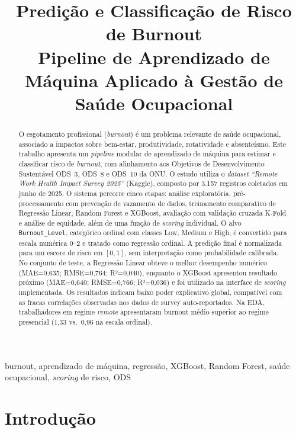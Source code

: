 \documentclass[conference]{IEEEtran}
\title{Predição e Classificação de Risco de Burnout\\{\large Pipeline de Aprendizado de Máquina Aplicado à Gestão de Saúde Ocupacional}}
\author{%
\IEEEauthorblockN{Breno Porto Pinheiro do Prado, RA 185196\\
Guilherme Bento Ramos, RA 185226}
\IEEEauthorblockA{\instituicao\\
\cidade\\
2026}
}
\begin{document}

\maketitle

\begin{abstract}
O esgotamento profissional (\textit{burnout}) é um problema relevante de
saúde ocupacional, associado a impactos sobre bem-estar, produtividade,
rotatividade e absenteísmo. Este trabalho apresenta um \textit{pipeline}
modular de aprendizado de máquina para estimar e classificar risco de
\textit{burnout}, com alinhamento aos Objetivos de Desenvolvimento
Sustentável ODS~3, ODS~8 e ODS~10 da ONU. O estudo utiliza o
\textit{dataset} \textit{``Remote Work Health Impact Survey 2025''}
(Kaggle), composto por 3.157 registros coletados em junho de 2025. O
sistema percorre cinco etapas: análise exploratória, pré-processamento
com prevenção de vazamento de dados, treinamento comparativo de
Regressão Linear, Random Forest e XGBoost, avaliação com validação
cruzada K-Fold e análise de equidade, além de uma função de
\textit{scoring} individual. O alvo \texttt{Burnout_Level}, categórico
ordinal com classes Low, Medium e High, é convertido para escala
numérica 0--2 e tratado como regressão ordinal. A predição final é
normalizada para um escore de risco em $[0,1]$, sem interpretação como
probabilidade calibrada. No conjunto de teste, a Regressão Linear obteve
o melhor desempenho numérico (MAE=0,635; RMSE=0,764; R²=0,040),
enquanto o XGBoost apresentou resultado próximo (MAE=0,640; RMSE=0,766;
R²=0,036) e foi utilizado na interface de \textit{scoring} implementada.
Os resultados indicam baixo poder explicativo global, compatível com as
fracas correlações observadas nos dados de survey auto-reportados. Na
EDA, trabalhadores em regime \textit{remote} apresentaram burnout médio
superior ao regime presencial (1,33 vs.\ 0,96 na escala ordinal).
\end{abstract}

\begin{IEEEkeywords}
burnout, aprendizado de máquina, regressão, XGBoost, Random Forest, saúde ocupacional, \textit{scoring} de risco, ODS
\end{IEEEkeywords}

\section{Introdução}
\label{sec:intro}
\end{document}

